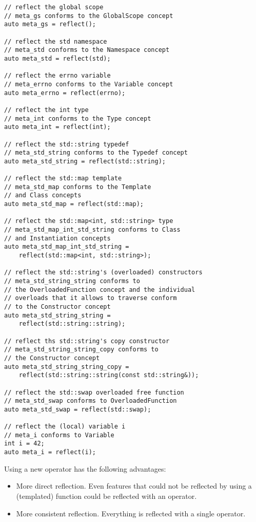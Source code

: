 \begin{lstlisting}
// reflect the global scope
// meta_gs conforms to the GlobalScope concept
auto meta_gs = reflect();

// reflect the std namespace
// meta_std conforms to the Namespace concept
auto meta_std = reflect(std);

// reflect the errno variable
// meta_errno conforms to the Variable concept
auto meta_errno = reflect(errno);

// reflect the int type
// meta_int conforms to the Type concept
auto meta_int = reflect(int);

// reflect the std::string typedef
// meta_std_string conforms to the Typedef concept
auto meta_std_string = reflect(std::string);

// reflect the std::map template
// meta_std_map conforms to the Template
// and Class concepts
auto meta_std_map = reflect(std::map);

// reflect the std::map<int, std::string> type
// meta_std_map_int_std_string conforms to Class
// and Instantiation concepts
auto meta_std_map_int_std_string = 
	reflect(std::map<int, std::string>);

// reflect the std::string's (overloaded) constructors
// meta_std_string_string conforms to
// the OverloadedFunction concept and the individual
// overloads that it allows to traverse conform
// to the Constructor concept
auto meta_std_string_string = 
	reflect(std::string::string);

// reflect ths std::string's copy constructor
// meta_std_string_string_copy conforms to
// the Constructor concept
auto meta_std_string_string_copy =
	reflect(std::string::string(const std::string&));

// reflect the std::swap overloaded free function
// meta_std_swap conforms to OverloadedFunction
auto meta_std_swap = reflect(std::swap);

// reflect the (local) variable i
// meta_i conforms to Variable
int i = 42;
auto meta_i = reflect(i);

\end{lstlisting}

Using a new operator has the following advantages:

\begin{itemize}
	\item More direct reflection. Even features that
	could not be reflected by using a (templated) function
	could be reflected with an operator.

	\item More consistent reflection. Everything is reflected
	with a single operator.
\end{itemize}

